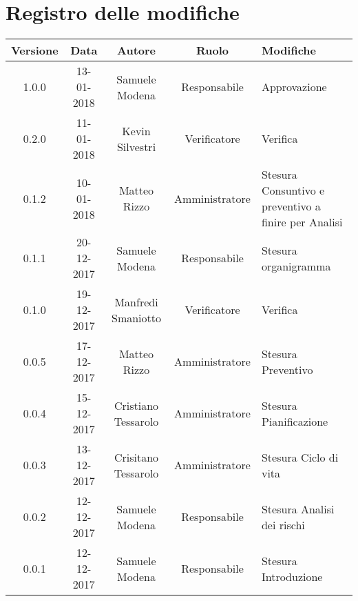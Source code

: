 \documentclass[./PianodiProgetto.tex]{subfiles}
\begin{document}
\chapter*{Registro delle modifiche}
\begin{center}	
	\begin{tabular}{|c|c|c|c|p{4cm}|}
		\hline
		\textbf{Versione} & \textbf{Data} & \textbf{Autore} & \textbf{Ruolo} & \textbf{Modifiche} \\ \hline
		\hline 1.0.0 & 13-01-2018 & Samuele Modena & Responsabile & Approvazione \\
 
		\hline 0.2.0 & 11-01-2018 & Kevin Silvestri & Verificatore & Verifica \\
 
		\hline 0.1.2 & 10-01-2018 & Matteo Rizzo & Amministratore & Stesura Consuntivo e preventivo a finire per Analisi \\
 
		\hline 0.1.1 & 20-12-2017 & Samuele Modena & Responsabile & Stesura organigramma \\
 
		\hline 0.1.0 & 19-12-2017 & Manfredi Smaniotto & Verificatore & Verifica \\
 
		\hline 0.0.5 & 17-12-2017 & Matteo Rizzo & Amministratore & Stesura Preventivo \\
 
		\hline 0.0.4 & 15-12-2017 & Cristiano Tessarolo & Amministratore & Stesura Pianificazione \\
 
		\hline 0.0.3 & 13-12-2017 & Crisitano Tessarolo & Amministratore & Stesura Ciclo di vita \\
 
		\hline 0.0.2 & 12-12-2017 & Samuele Modena & Responsabile & Stesura Analisi dei rischi \\
 
		\hline 0.0.1 & 12-12-2017 & Samuele Modena & Responsabile & Stesura Introduzione \\
 
		\hline
 
	\end{tabular}
\end{center}	
\end{document}
